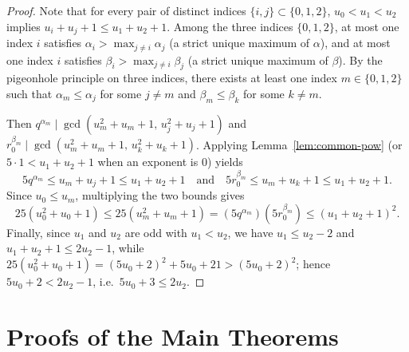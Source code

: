 \documentclass[11pt]{amsart}
\theoremstyle{definition}
\theoremstyle{remark}
\begin{document}
\begin{proof}
Note that for every pair of distinct indices $\{i, j\} \subset \{0, 1, 2\}$, $u_0 < u_1 < u_2$ implies $u_i + u_j + 1 \le u_1 + u_2 + 1$. Among the three indices $\{0, 1, 2\}$, at most one index $i$ satisfies $\alpha_i > \max_{j \ne i} \alpha_j$ (a strict unique maximum of $\alpha$), and at most one index $i$ satisfies $\beta_i > \max_{j \ne i} \beta_j$ (a strict unique maximum of $\beta$). By the pigeonhole principle on three indices, there exists at least one index $m \in \{0, 1, 2\}$ such that $\alpha_m \le \alpha_j$ for some $j \ne m$ and $\beta_m \le \beta_k$ for some $k \ne m$.

Then $q^{\alpha_m} \mid \gcd(u_m^2 + u_m + 1,\, u_j^2 + u_j + 1)$ and $r_0^{\beta_m} \mid \gcd(u_m^2 + u_m + 1,\, u_k^2 + u_k + 1)$. Applying Lemma~\ref{lem:common-pow} (or $5 \cdot 1 < u_1 + u_2 + 1$ when an exponent is $0$) yields
\[
  5 q^{\alpha_m} \le u_m + u_j + 1 \le u_1 + u_2 + 1 \quad \text{and} \quad 5 r_0^{\beta_m} \le u_m + u_k + 1 \le u_1 + u_2 + 1.
\]
Since $u_0 \le u_m$, multiplying the two bounds gives
\[
  25(u_0^2 + u_0 + 1) \le 25(u_m^2 + u_m + 1) = (5 q^{\alpha_m})(5 r_0^{\beta_m}) \le (u_1 + u_2 + 1)^2.
\]
Finally, since $u_1$ and $u_2$ are odd with $u_1 < u_2$, we have $u_1 \le u_2 - 2$ and $u_1 + u_2 + 1 \le 2 u_2 - 1$, while $25(u_0^2 + u_0 + 1) = (5 u_0 + 2)^2 + 5 u_0 + 21 > (5 u_0 + 2)^2$; hence $5 u_0 + 2 < 2 u_2 - 1$, i.e.\ $5 u_0 + 3 \le 2 u_2$.
\end{proof}

\section{Proofs of the Main Theorems}
\end{document}
